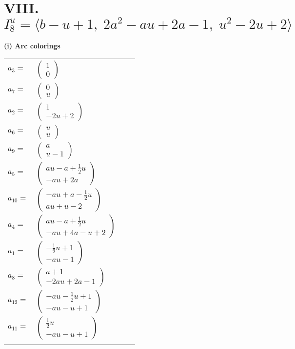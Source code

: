 \documentclass[1p]{elsarticle_modified}
\theoremstyle{definition}
\begin{document}
\centering \section*{VIII. $I^u_{8}= \langle b- u+1,\;2 a^2- a u+2 a-1,\;u^2-2 u+2 \rangle$}
\flushleft \textbf{(i) Arc colorings}\\
\begin{tabular}{m{7pt} m{180pt} m{7pt} m{180pt} }
\flushright $a_{3}=$&$\begin{pmatrix}1\\0\end{pmatrix}$ \\
\flushright $a_{7}=$&$\begin{pmatrix}0\\u\end{pmatrix}$ \\
\flushright $a_{2}=$&$\begin{pmatrix}1\\-2 u+2\end{pmatrix}$ \\
\flushright $a_{6}=$&$\begin{pmatrix}u\\u\end{pmatrix}$ \\
\flushright $a_{9}=$&$\begin{pmatrix}a\\u-1\end{pmatrix}$ \\
\flushright $a_{5}=$&$\begin{pmatrix}a u- a+\frac{1}{2} u\\- a u+2 a\end{pmatrix}$ \\
\flushright $a_{10}=$&$\begin{pmatrix}- a u+a-\frac{1}{2} u\\a u+u-2\end{pmatrix}$ \\
\flushright $a_{4}=$&$\begin{pmatrix}a u- a+\frac{1}{2} u\\- a u+4 a- u+2\end{pmatrix}$ \\
\flushright $a_{1}=$&$\begin{pmatrix}-\frac{1}{2} u+1\\- a u-1\end{pmatrix}$ \\
\flushright $a_{8}=$&$\begin{pmatrix}a+1\\-2 a u+2 a-1\end{pmatrix}$ \\
\flushright $a_{12}=$&$\begin{pmatrix}- a u-\frac{1}{2} u+1\\- a u- u+1\end{pmatrix}$ \\
\flushright $a_{11}=$&$\begin{pmatrix}\frac{1}{2} u\\- a u- u+1\end{pmatrix}$\\&\end{tabular}
\end{document}
